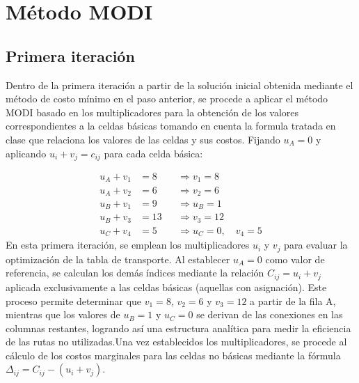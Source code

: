 \documentclass{article}
\begin{document}
	\section{Método MODI }
		\subsection{Primera iteración}
	
	Dentro de la primera iteración a partir de la solución inicial obtenida mediante el método de costo mínimo en el paso anterior, se procede a aplicar el método MODI basado en los multiplicadores  para la obtención de los valores correspondientes a la celdas básicas tomando en cuenta la formula tratada en clase que relaciona los valores de las celdas y sus costos.
	Fijando $u_A = 0$ y aplicando $u_i + v_j = c_{ij}$ para cada celda básica:
	
	\begin{align*}
		u_A + v_1 &= 8  &&\Longrightarrow v_1 = 8  \\
		u_A + v_2 &= 6  &&\Longrightarrow v_2 = 6  \\
		u_B + v_1 &= 9  &&\Longrightarrow u_B = 1  \\
		u_B + v_3 &= 13 &&\Longrightarrow v_3 = 12 \\
		u_C + v_4 &= 5  &&\Longrightarrow u_C = 0,\quad v_4 = 5
	\end{align*}
	En esta primera iteración, se emplean los multiplicadores $u_i$ y $v_j$ para evaluar la optimización de la tabla de transporte. Al establecer $u_A = 0$ como valor de referencia, se calculan los demás índices mediante la relación $C_{ij} = u_i + v_j$ aplicada exclusivamente a las celdas básicas (aquellas con asignación). Este proceso permite determinar que $v_1=8$, $v_2=6$ y $v_3=12$ a partir de la fila A, mientras que los valores de $u_B=1$ y $u_C=0$ se derivan de las conexiones en las columnas restantes, logrando así una estructura analítica para medir la eficiencia de las rutas no utilizadas.Una vez establecidos los multiplicadores, se procede al cálculo de los costos marginales para las celdas no básicas mediante la fórmula $\Delta_{ij} = C_{ij} - (u_i + v_j)$. 
	
\end{document}

